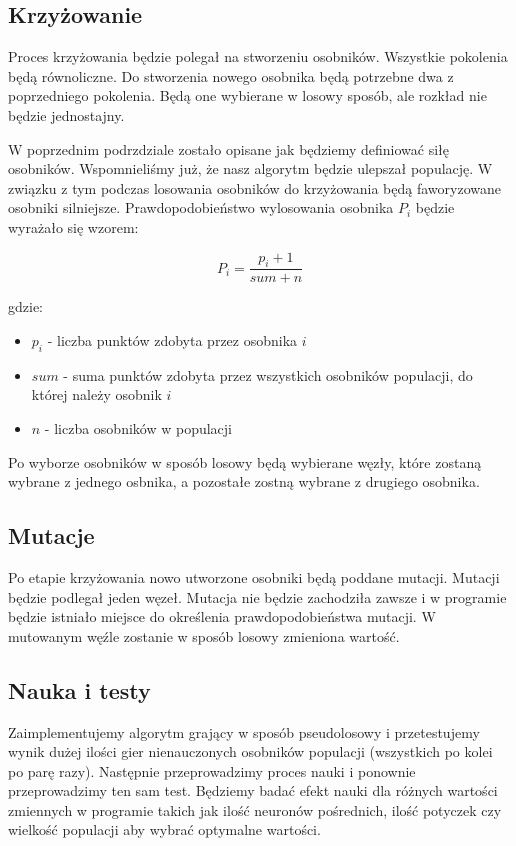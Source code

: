 \documentclass[paper=a4, fontsize=11pt]{scrartcl} %
\numberwithin{equation}{section} %
\numberwithin{figure}{section} %
\numberwithin{table}{section} %
\begin{document}
\subsection{Krzyżowanie}
Proces krzyżowania będzie polegał na stworzeniu osobników. Wszystkie pokolenia będą równoliczne. Do stworzenia nowego osobnika będą potrzebne dwa z poprzedniego pokolenia. Będą one wybierane w losowy sposób, ale rozkład nie będzie jednostajny.

W poprzednim podrzdziale zostało opisane jak będziemy definiować siłę osobników. Wspomnieliśmy już, że nasz algorytm będzie ulepszał populację. W związku z tym podczas losowania osobników do krzyżowania będą faworyzowane osobniki silniejsze. Prawdopodobieństwo wylosowania osobnika ${P_i}$ będzie wyrażało się wzorem:

\begin{equation}
P_i=\frac{p_i + 1}{sum+n}
\end{equation}

gdzie:

\begin{itemize}
	\item ${p_i}$ - liczba punktów zdobyta przez osobnika $i$
	\item $sum$ - suma punktów zdobyta przez wszystkich osobników populacji, do której należy osobnik $i$
	\item $n$ - liczba osobników w populacji
\end{itemize}

Po wyborze osobników w sposób losowy będą wybierane węzły, które zostaną wybrane z jednego osbnika, a pozostałe zostną wybrane z drugiego osobnika.

\subsection{Mutacje}
Po etapie krzyżowania nowo utworzone osobniki będą poddane mutacji. Mutacji będzie podlegał jeden węzeł. Mutacja nie będzie zachodziła zawsze i w programie będzie istniało miejsce do określenia prawdopodobieństwa mutacji. W mutowanym węźle zostanie w sposób losowy zmieniona wartość.

\subsection{Nauka i testy}
Zaimplementujemy algorytm grający w sposób pseudolosowy i przetestujemy wynik dużej ilości gier nienauczonych osobników populacji (wszystkich po kolei po parę razy). Następnie przeprowadzimy proces nauki i ponownie przeprowadzimy ten sam test. Będziemy badać efekt nauki dla różnych wartości zmiennych w programie takich jak ilość neuronów pośrednich, ilość potyczek czy wielkość populacji aby wybrać optymalne wartości. 


\clearpage

%



\nocite{*}


\end{document}
